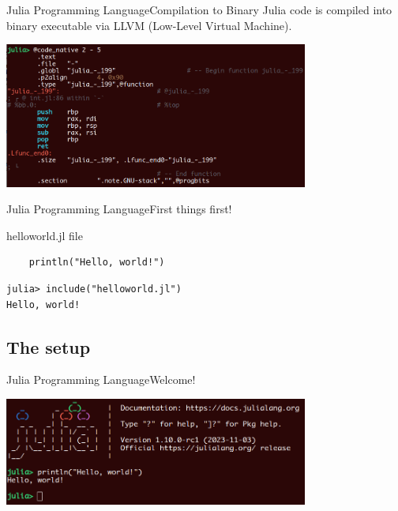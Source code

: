 \documentclass[11pt]{beamer}
\begin{document}
\begin{frame}[fragile]{Julia Programming Language}{Compilation to Binary}
Julia code is compiled into binary executable via LLVM (Low-Level Virtual Machine).
	\begin{center}
			\includegraphics[width=10cm]{images/assembly.png}
	\end{center}
\end{frame}


\begin{frame}[fragile]{Julia Programming Language}{First things first!}
\begin{exampleblock}{helloworld.jl file}
\begin{lstlisting}
	println("Hello, world!")
\end{lstlisting}
\end{exampleblock}

\begin{lstlisting}
julia> include("helloworld.jl")
Hello, world!
\end{lstlisting}

\end{frame}

\subsection{The setup}
\begin{frame}[fragile]{Julia Programming Language}{Welcome!}
	\begin{center}
			\includegraphics[width=10cm]{images/welcome.png}
	\end{center}
\end{frame}
\end{document}
